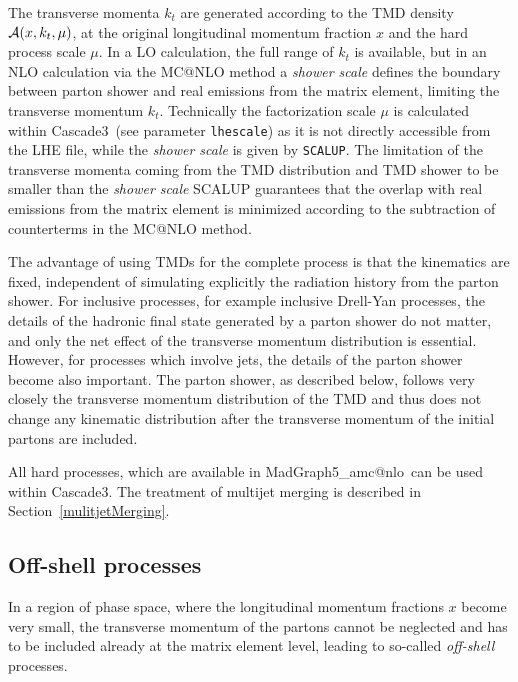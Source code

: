 \documentclass[11pt]{article} \usepackage{mystyle-new}
\makeatletter
\def\prp{t}
\def\kt{\ensuremath{k_{\prp}}}
\def\cascade{{\sc Cascade3}}
\def\MGvATNLO{{\sc MadGraph5}\_a{\sc mc@nlo}}
\makeatother
\begin{document}
The transverse momenta $k_t$ are generated according to the TMD density ${\cal A}(x,k_{t},\mu)$, at the original longitudinal momentum fraction $x$ and the hard process scale $\mu$.
In a LO calculation, the full range of $\kt$ is available, but in an NLO calculation via  the MC@NLO method a {\it shower scale} defines the boundary between parton shower and real emissions from the matrix element, limiting the transverse momentum \kt .
Technically the factorization scale $\mu$ is calculated within \cascade\ (see parameter \verb+lhescale+)  as it is not directly accessible from the LHE file, while the {\it shower scale} is given by \verb+SCALUP+. 
The limitation of the transverse momenta coming from the TMD distribution and TMD shower to be smaller than the {\it shower scale} SCALUP guarantees that the overlap 
with real emissions from the matrix element is minimized according to the subtraction of counterterms in the MC@NLO method.

The advantage of using TMDs for the complete process is that the kinematics are fixed, independent of simulating explicitly the radiation history from the parton shower. For inclusive processes, for example inclusive Drell-Yan processes, the details of the hadronic final state generated by a parton shower do not matter, and  only the net effect of the transverse momentum distribution is essential. However, for processes which involve jets, the details of the parton shower become also important.
The parton shower, as described below, follows very closely the transverse momentum distribution of the TMD and thus does not change any kinematic distribution after the transverse momentum of the initial partons are included.

All hard processes, which are available in  \MGvATNLO\ 
can be used within \cascade . The treatment of multijet merging is described in Section~\ref{mulitjetMerging}.

\subsection{Off-shell processes}
\label{sec:OffShell}
In a region of phase space, where the longitudinal momentum fractions $x$ become very small, the transverse momentum of the partons cannot be neglected and has to be included already at the matrix element level, leading to so-called {\it off-shell} processes.
\end{document}
